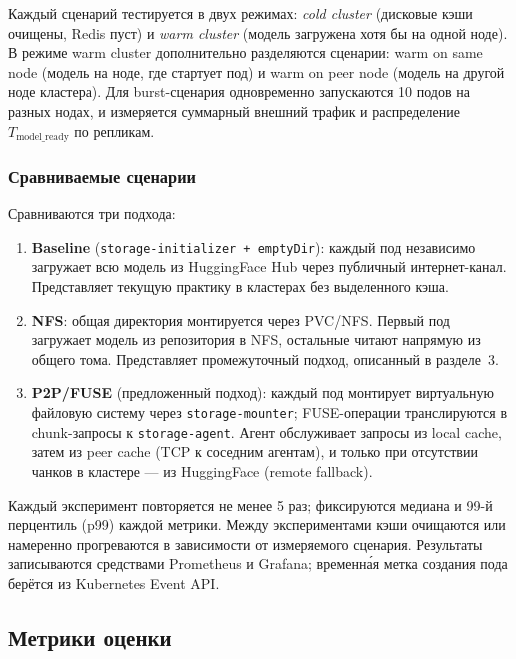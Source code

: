 Каждый сценарий тестируется в двух режимах: \textit{cold cluster} (дисковые кэши очищены, Redis пуст) и \textit{warm cluster} (модель загружена хотя бы на одной ноде). В режиме warm cluster дополнительно разделяются сценарии: warm on same node (модель на ноде, где стартует под) и warm on peer node (модель на другой ноде кластера). Для burst-сценария одновременно запускаются 10 подов на разных нодах, и измеряется суммарный внешний трафик и распределение $T_{\mathrm{model\_ready}}$ по репликам.

\subsubsection*{Сравниваемые сценарии}

Сравниваются три подхода:

\begin{enumerate}[leftmargin=*]
  \item \textbf{Baseline} (\texttt{storage-initializer + emptyDir}): каждый под независимо загружает всю модель из HuggingFace Hub через публичный интернет-канал. Представляет текущую практику в кластерах без выделенного кэша.

  \item \textbf{NFS}: общая директория монтируется через PVC/NFS. Первый под загружает модель из репозитория в NFS, остальные читают напрямую из общего тома. Представляет промежуточный подход, описанный в разделе~3.

  \item \textbf{P2P/FUSE} (предложенный подход): каждый под монтирует виртуальную файловую систему через \texttt{storage-mounter}; FUSE-операции транслируются в chunk-запросы к \texttt{storage-agent}. Агент обслуживает запросы из local cache, затем из peer cache (TCP к соседним агентам), и только при отсутствии чанков в кластере --- из HuggingFace (remote fallback).
\end{enumerate}

Каждый эксперимент повторяется не менее 5 раз; фиксируются медиана и 99-й перцентиль (p99) каждой метрики. Между экспериментами кэши очищаются или намеренно прогреваются в зависимости от измеряемого сценария. Результаты записываются средствами Prometheus и Grafana; временна́я метка создания пода берётся из Kubernetes Event API.

\subsection{Метрики оценки}

